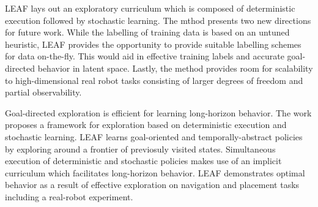 \documentclass[11pt,letterpaper]{article}
\begin{document}
LEAF lays out an exploratory curriculum which is composed of deterministic execution followed by stochastic learning. The mthod presents two new directions for future work. While the labelling of training data is based on an untuned heuristic, LEAF provides the opportunity to provide suitable labelling schemes for data on-the-fly. This would aid in effective training labels and accurate goal-directed behavior in latent space. Lastly, the method provides room for scalability to high-dimensional real robot tasks consisting of larger degrees of freedom and partial observability. 

Goal-directed exploration is efficient for learning long-horizon behavior. The work proposes a framework for exploration based on deterministic execution and stochastic learning. LEAF learns goal-oriented and temporally-abstract policies by exploring around a frontier of previosuly visited states. Simultaneous execution of deterministic and stochastic policies makes use of an implicit curriculum which facilitates long-horizon behavior. LEAF demonstrates optimal behavior as a result of effective exploration on navigation and placement tasks including a real-robot experiment.  
\end{document}
